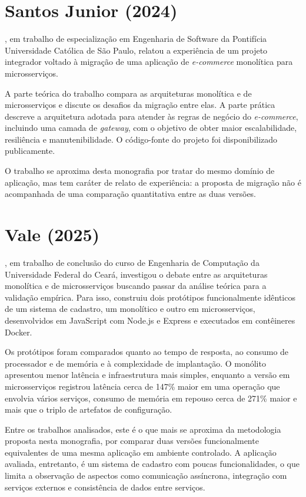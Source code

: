 \section{Santos Junior (2024)}

, em trabalho de especialização em Engenharia de Software da
Pontifícia Universidade Católica de São Paulo, relatou a experiência de um projeto integrador
voltado à migração de uma aplicação de \textit{e-commerce} monolítica para microsserviços.

A parte teórica do trabalho compara as arquiteturas monolítica e de microsserviços e discute os
desafios da migração entre elas. A parte prática descreve a arquitetura adotada para atender às
regras de negócio do \textit{e-commerce}, incluindo uma camada de \textit{gateway}, com o
objetivo de obter maior escalabilidade, resiliência e manutenibilidade. O código-fonte do
projeto foi disponibilizado publicamente.

O trabalho se aproxima desta monografia por tratar do mesmo domínio de aplicação, mas tem
caráter de relato de experiência: a proposta de migração não é acompanhada de uma comparação
quantitativa entre as duas versões.

\section{Vale (2025)}

, em trabalho de conclusão do curso de Engenharia de Computação da
Universidade Federal do Ceará, investigou o debate entre as arquiteturas monolítica e de
microsserviços buscando passar da análise teórica para a validação empírica. Para isso,
construiu dois protótipos funcionalmente idênticos de um sistema de cadastro, um monolítico e
outro em microsserviços, desenvolvidos em JavaScript com Node.js e Express e executados em
contêineres Docker.

Os protótipos foram comparados quanto ao tempo de resposta, ao consumo de processador e de
memória e à complexidade de implantação. O monólito apresentou menor latência e infraestrutura
mais simples, enquanto a versão em microsserviços registrou latência cerca de 147\% maior em
uma operação que envolvia vários serviços, consumo de memória em repouso cerca de 271\% maior
e mais que o triplo de artefatos de configuração.

Entre os trabalhos analisados, este é o que mais se aproxima da metodologia proposta nesta
monografia, por comparar duas versões funcionalmente equivalentes de uma mesma aplicação em
ambiente controlado. A aplicação avaliada, entretanto, é um sistema de cadastro com poucas
funcionalidades, o que limita a observação de aspectos como comunicação assíncrona,
integração com serviços externos e consistência de dados entre serviços.

